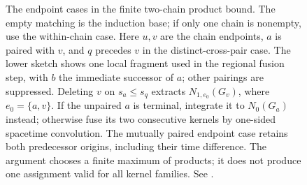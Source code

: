 \begin{figure}
\caption[Endpoint elimination in two ordered chains]{The endpoint cases in the finite two-chain product bound. The empty
matching is the induction base; if only one chain is nonempty, use the
within-chain case.
Here $u,v$ are the chain endpoints, $a$ is paired with $v$,
and $q$ precedes $v$ in the distinct-cross-pair case. The lower sketch
shows one local fragment used in the regional fusion step, with
$b$ the immediate successor of $a$; other pairings are suppressed. Deleting $v$ on $s_a\le s_q$ extracts
$N_{1,e_0}(G_v)$, where $e_0=\{a,v\}$. If the unpaired $a$ is terminal,
integrate it to $N_0(G_a)$ instead; otherwise fuse its two consecutive
kernels by one-sided spacetime convolution. The mutually paired endpoint case retains
both predecessor origins, including their time difference. The argument
chooses a finite maximum of products; it does not produce one assignment
valid for all kernel families. See
.}
\label{Fig:endpoint-elimination}
\end{figure}
